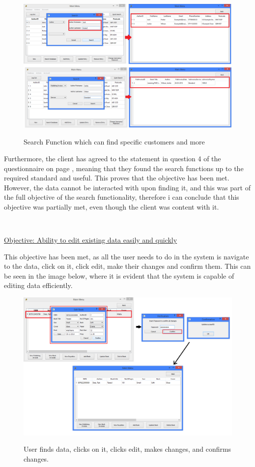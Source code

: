 \begin{figure}[H]
    \includegraphics[width=\textwidth]{./Evaluation/Evidence/Search.png}
    \label{fig:SearchDBFunction} \caption{Search Function which can find specific customers and more}
\end{figure}

Furthermore, the client has agreed to the statement in question 4 of the questionnaire on page \pageref{fig:QuestionnairePage1}, meaning that they found the search functions up to the required standard and useful. This proves that the objective has been met. However, the data cannot be interacted with upon finding it, and this was part of the full objective of the search functionality, therefore i can conclude that this objective was partially met, even though the client was content with it.

\

\underline{Objective: Ability to edit existing data easily and quickly}

This objective has been met, as all the user needs to do in the system is navigate to the data, click on it, click edit, make their changes and confirm them. This can be seen in the image below, where it is evident that the system is capable of editing data efficiently.

\begin{figure}[H]
    \includegraphics[width=\textwidth]{./Evaluation/Evidence/EditData.png}
    \label{fig:EditData} \caption{User finds data, clicks on it, clicks edit, makes changes, and confirms changes.}
\end{figure}

